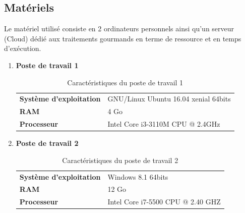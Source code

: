     \subsection{Matériels}
    Le matériel utilisé consiste en 2 ordinateurs personnels ainsi qu'un serveur (Cloud) dédié aux traitements gourmands en terme de ressource et en temps d'exécution.
    \begin{enumerate}
        \item{\textbf{Poste de travail 1}}
        \begin{table}[h!]
            \begin{center}
                \begin{tabular}{|C{5cm}|C{8cm}|}
                    \hline
                    \textbf{Système d'exploitation} &  GNU/Linux Ubuntu 16.04 xenial 64bits \\
                    \textbf{RAM} &  4 Go \\
                    \textbf{Processeur} & Intel Core i3-3110M CPU @ 2.4GHz \\
                    \hline
                \end{tabular}
            \end{center}
        \caption{Caractéristiques du poste de travail 1}
        \end{table}

        \item{\textbf{Poste de travail 2}}
        \begin{table}[h!]
            \begin{center}
                \begin{tabular}{|C{5cm}|C{8cm}|}
                    \hline
                    \textbf{Système d'exploitation} &  Windows 8.1 64bits \\
                    \textbf{RAM} &  12 Go \\
                    \textbf{Processeur} & Intel Core i7-5500 CPU @ 2.40 GHZ \\
                    \hline
                \end{tabular}
            \end{center}
        \caption{Caractéristiques du poste de travail 2}
        \end{table}


\end{enumerate}
